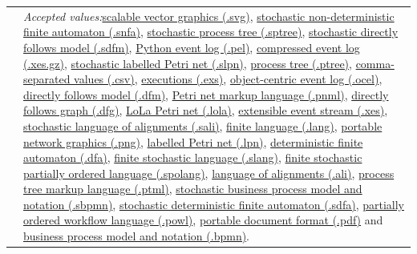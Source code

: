 {\begin{tabularx}{\linewidth}{lX}
&\textit{Accepted values:}\quad \hyperref[filehandler:scalable vector graphics]{scalable vector graphics (.svg)}, \hyperref[filehandler:stochastic non-deterministic finite automaton]{stochastic non-deterministic finite automaton (.snfa)}, \hyperref[filehandler:stochastic process tree]{stochastic process tree (.sptree)}, \hyperref[filehandler:stochastic directly follows model]{stochastic directly follows model (.sdfm)}, \hyperref[filehandler:Python event log]{Python event log (.pel)}, \hyperref[filehandler:compressed event log]{compressed event log (.xes.gz)}, \hyperref[filehandler:stochastic labelled Petri net]{stochastic labelled Petri net (.slpn)}, \hyperref[filehandler:process tree]{process tree (.ptree)}, \hyperref[filehandler:comma-separated values]{comma-separated values (.csv)}, \hyperref[filehandler:executions]{executions (.exs)}, \hyperref[filehandler:object-centric event log]{object-centric event log (.ocel)}, \hyperref[filehandler:directly follows model]{directly follows model (.dfm)}, \hyperref[filehandler:Petri net markup language]{Petri net markup language (.pnml)}, \hyperref[filehandler:directly follows graph]{directly follows graph (.dfg)}, \hyperref[filehandler:LoLa Petri net]{LoLa Petri net (.lola)}, \hyperref[filehandler:extensible event stream]{extensible event stream (.xes)}, \hyperref[filehandler:stochastic language of alignments]{stochastic language of alignments (.sali)}, \hyperref[filehandler:finite language]{finite language (.lang)}, \hyperref[filehandler:portable network graphics]{portable network graphics (.png)}, \hyperref[filehandler:labelled Petri net]{labelled Petri net (.lpn)}, \hyperref[filehandler:deterministic finite automaton]{deterministic finite automaton (.dfa)}, \hyperref[filehandler:finite stochastic language]{finite stochastic language (.slang)}, \hyperref[filehandler:finite stochastic partially ordered language]{finite stochastic partially ordered language (.spolang)}, \hyperref[filehandler:language of alignments]{language of alignments (.ali)}, \hyperref[filehandler:process tree markup language]{process tree markup language (.ptml)}, \hyperref[filehandler:stochastic business process model and notation]{stochastic business process model and notation (.sbpmn)}, \hyperref[filehandler:stochastic deterministic finite automaton]{stochastic deterministic finite automaton (.sdfa)}, \hyperref[filehandler:partially ordered workflow language]{partially ordered workflow language (.powl)}, \hyperref[filehandler:portable document format]{portable document format (.pdf)} and \hyperref[filehandler:business process model and notation]{business process model and notation (.bpmn)}.\\

\end{tabularx}}
